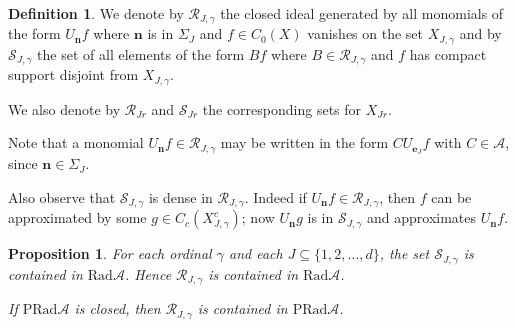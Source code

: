 \documentclass[12pt]{amsart}
\newtheorem{proposition}[theorem]{Proposition}
\theoremstyle{definition}
\newtheorem{definition}[theorem]{Definition}
\newcommand{\mcA}{\mathcal{A}}
\newcommand{\mcR}{\mathcal{R}}
\newcommand{\mcS}{\mathcal{S}}
\newcommand{\rad}{\mathrm{Rad}}
\newcommand{\prad}{\mathrm{PRad}}
\newcommand{\bo}[1]{\mathbf{#1}}
\newcommand{\bon}{\mathbf{n}}
\begin{document}
\begin{definition}
We denote by $\mcR_{J,\gamma}$ the closed ideal generated
by all monomials of the form $U_\bon f$ where $\bon$ is in $\Sigma_J$
and $f\in C_0(X)$ vanishes on the set $X_{J,\gamma}$ and by
$\mcS_{J,\gamma}$ the set of all elements of the form $B f$
where $B\in \mcR_{J,\gamma}$
and $f$ has compact support disjoint from $X_{J,\gamma}$.

We also denote by $\mcR_{Jr}$ and $\mcS_{Jr}$ the corresponding
sets for $X_{Jr}$.
\end{definition}

Note that 
a monomial $U_{\bon} f\in \mcR_{J,\gamma}$ may be written in the form
$CU_{\bo{e}_J}f$ with $C \in \mcA$, since $\bon \in \Sigma_J$.

Also observe that $\mcS_{J,\gamma }$ is dense in
$\mcR_{J,\gamma}$.
Indeed if $U_{\bon}f\in \mathcal{R}_{J,\gamma }$, then
$f$ can be approximated by some $g\in C_c(X_{J,\gamma}^c)$;
now $U_{\bon}g$ is in $\mcS_{J,\gamma}$ and approximates $U_{\bon}f$.

\begin{proposition}\label{indu}
For each ordinal $\gamma$ and each
$J\subseteq\{1,2,\ldots,d\}$, the set $\mcS_{J,\gamma}$
is contained in $\rad\mcA$.
Hence $\mathcal{R}_{J,\gamma }$ is contained in
$\rad\mcA$.

If $\prad\mcA$ is closed, then  $\mcR_{J,\gamma}$ is contained
in $\prad\mcA$.
\end{proposition}
\end{document}
